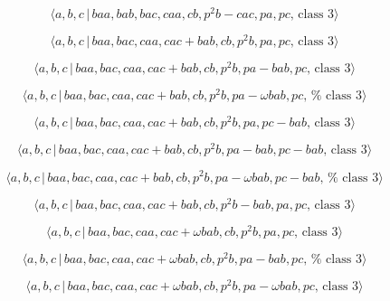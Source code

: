 \documentclass[10pt]{article}
\begin{document}
\begin{equation}
\langle a,b,c\,|\,baa,bab,bac,caa,cb,p^2b-cac,pa,pc,\,\text{class }3\rangle 
\tag{7.2706}
\end{equation}

\begin{equation}
\langle a,b,c\,|\,baa,bac,caa,cac+bab,cb,p^2b,pa,pc,\,\text{class }3\rangle 
\tag{7.2707}
\end{equation}

\begin{equation}
\langle a,b,c\,|\,baa,bac,caa,cac+bab,cb,p^2b,pa-bab,pc,\,\text{class }%
3\rangle  \tag{7.2708}
\end{equation}

\begin{equation}
\langle a,b,c\,|\,baa,bac,caa,cac+bab,cb,p^{2}b,pa-\omega bab,pc,\,\text{%
class }3\rangle  \tag{7.2709}
\end{equation}

\begin{equation}
\langle a,b,c\,|\,baa,bac,caa,cac+bab,cb,p^2b,pa,pc-bab,\,\text{class }%
3\rangle  \tag{7.2710}
\end{equation}

\begin{equation}
\langle a,b,c\,|\,baa,bac,caa,cac+bab,cb,p^2b,pa-bab,pc-bab,\,\text{class }%
3\rangle  \tag{7.2711}
\end{equation}

\begin{equation}
\langle a,b,c\,|\,baa,bac,caa,cac+bab,cb,p^{2}b,pa-\omega bab,pc-bab,\,\text{%
class }3\rangle  \tag{7.2712}
\end{equation}

\begin{equation}
\langle a,b,c\,|\,baa,bac,caa,cac+bab,cb,p^2b-bab,pa,pc,\,\text{class }%
3\rangle  \tag{7.2713}
\end{equation}

\begin{equation}
\langle a,b,c\,|\,baa,bac,caa,cac+\omega bab,cb,p^{2}b,pa,pc,\,\text{class }%
3\rangle  \tag{7.2714}
\end{equation}

\begin{equation}
\langle a,b,c\,|\,baa,bac,caa,cac+\omega bab,cb,p^{2}b,pa-bab,pc,\,\text{%
class }3\rangle  \tag{7.2715}
\end{equation}

\begin{equation}
\langle a,b,c\,|\,baa,bac,caa,cac+\omega bab,cb,p^{2}b,pa-\omega bab,pc,\,%
\text{class }3\rangle  \tag{7.2716}
\end{equation}
\end{document}
